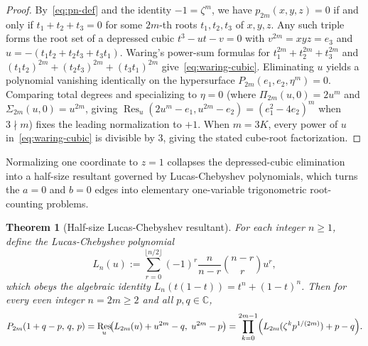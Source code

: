 \documentclass[10pt]{article}
\numberwithin{equation}{section}
\theoremstyle{plain}
\newtheorem{theorem}{Theorem}[section]
\theoremstyle{definition}
\newcommand{\C}{\mathbb{C}}
\newcommand{\1}{\mathbf{1}}
\DeclareMathOperator{\Res}{Res}
\begin{document}
\begin{proof}
By~\eqref{eq:pn-def} and the identity $-1 = \zeta^m$, we have $p_{2m}(x, y, z) = 0$ if and only if $t_1 + t_2 + t_3 = 0$ for some $2m$-th roots $t_1, t_2, t_3$ of $x, y, z$. Any such triple forms the root set of a depressed cubic $t^3 - u t - v = 0$ with $v^{2m} = xyz = e_3$ and $u = -(t_1 t_2 + t_2 t_3 + t_3 t_1)$. Waring's power-sum formulas for $t_1^{2m} + t_2^{2m} + t_3^{2m}$ and $(t_1 t_2)^{2m} + (t_2 t_3)^{2m} + (t_3 t_1)^{2m}$ give~\eqref{eq:waring-cubic}. Eliminating $u$ yields a polynomial vanishing identically on the hypersurface $P_{2m}(e_1, e_2, \eta^m) = 0$. Comparing total degrees and specializing to $\eta = 0$ (where $\Pi_{2m}(u, 0) = 2u^m$ and $\Sigma_{2m}(u, 0) = u^{2m}$, giving $\Res_u(2u^m - e_1, u^{2m} - e_2) = (e_1^2 - 4e_2)^m$ when $3 \nmid m$) fixes the leading normalization to $+1$. When $m = 3K$, every power of $u$ in~\eqref{eq:waring-cubic} is divisible by $3$, giving the stated cube-root factorization.
\end{proof}

Normalizing one coordinate to $z = 1$ collapses the depressed-cubic elimination into a half-size resultant governed by Lucas-Chebyshev polynomials, which turns the $a = 0$ and $b = 0$ edges into elementary one-variable trigonometric root-counting problems.

\begin{theorem}[Half-size Lucas-Chebyshev resultant]\label{thm:res-lucas}
For each integer $n \ge 1$, define the Lucas-Chebyshev polynomial
\begin{equation}\label{eq:Ln-def}
L_n(u) := \sum_{r=0}^{\lfloor n/2 \rfloor} (-1)^r \frac{n}{n - r}\binom{n - r}{r} u^r,
\end{equation}
which obeys the algebraic identity $L_n(t(1 - t)) = t^n + (1 - t)^n$. Then for every even integer $n = 2m \ge 2$ and all $p, q \in \C$,
\begin{equation}\label{eq:lucas-res}
P_{2m}(1 + q - p,\, q,\, p)
= \Res_u\!\bigl(L_{2m}(u) + u^{2m} - q,\; u^{2m} - p\bigr)
= \prod_{k=0}^{2m-1}\Bigl(L_{2m}(\zeta^k p^{1/(2m)}) + p - q\Bigr).
\end{equation}
\end{theorem}
\end{document}
